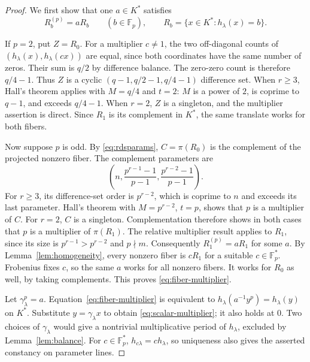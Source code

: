 \documentclass[11pt]{article}
\theoremstyle{definition}
\theoremstyle{remark}
\newcommand{\Fp}{\mathbb F_p}
\numberwithin{equation}{section}
\begin{document}
\begin{proof}
We first show that one \(a\in K^*\) satisfies
\begin{equation}\label{eq:fiber-multiplier}
 R_b^{(p)}=aR_b\qquad(b\in\Fp),
 \qquad R_b=\{x\in K^*:h_\lambda(x)=b\}.
\end{equation}

If \(p=2\), put \(Z=R_0\). For a multiplier \(c\ne1\), the two
off-diagonal counts of \((h_\lambda(x),h_\lambda(cx))\) are equal,
since both coordinates have the same number of zeros. Their sum is
\(q/2\) by difference balance. The zero-zero count is therefore
\(q/4-1\). Thus \(Z\) is a cyclic
\((q-1,q/2-1,q/4-1)\) difference set.
When \(r\ge3\), Hall's theorem applies with \(M=q/4\) and \(t=2\):
\(M\) is a power of \(2\), is coprime to \(q-1\), and exceeds
\(q/4-1\). When \(r=2\), \(Z\) is a singleton, and the multiplier
assertion is direct. Since \(R_1\) is its complement in \(K^*\),
the same translate works for both fibers.

Now suppose \(p\) is odd. By \eqref{eq:rdsparams},
\(C=\pi(R_0)\) is the complement of the projected nonzero fiber.
The complement parameters are
\[
 \left(n,\frac{p^{r-1}-1}{p-1},
            \frac{p^{r-2}-1}{p-1}\right).
\]
For \(r\ge3\), its difference-set order is \(p^{r-2}\), which is
coprime to \(n\) and exceeds its last parameter.
Hall's theorem with \(M=p^{r-2}\), \(t=p\), shows that \(p\) is a
multiplier of \(C\). For \(r=2\), \(C\) is a singleton.
Complementation therefore shows in both cases that \(p\) is a
multiplier of \(\pi(R_1)\).
The relative multiplier result applies to \(R_1\), since its size
is \(p^{r-1}>p^{r-2}\) and \(p\nmid m\).
Consequently \(R_1^{(p)}=aR_1\) for some \(a\).
By Lemma~\ref{lem:homogeneity}, every nonzero fiber is \(cR_1\)
for a suitable \(c\in\Fp^*\). Frobenius fixes \(c\), so the same
\(a\) works for all nonzero fibers. It works for \(R_0\) as well,
by taking complements. This proves \eqref{eq:fiber-multiplier}.

Let \(\gamma_\lambda^p=a\). Equation~\eqref{eq:fiber-multiplier}
is equivalent to
\(h_\lambda(a^{-1}y^p)=h_\lambda(y)\) on \(K^*\).
Substitute \(y=\gamma_\lambda x\) to obtain
\eqref{eq:scalar-multiplier}; it also holds at \(0\).
Two choices of \(\gamma_\lambda\) would give a nontrivial multiplicative
period of \(h_\lambda\), excluded by Lemma~\ref{lem:balance}.
For \(c\in\Fp^*\), \(h_{c\lambda}=c h_\lambda\), so uniqueness
also gives the asserted constancy on parameter lines.
\end{proof}
\end{document}
